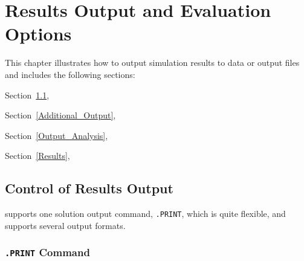 


\chapter{Results Output and Evaluation Options}
\label{Output}

{
This chapter illustrates how to output simulation results to data or output
files and includes the following sections:
\begin{XyceItemize}
  \item Section~\ref{Output_Control}, 
  \item Section~\ref{Additional_Output}, 
  \item Section~\ref{Output_Analysis}, 
  \item Section~\ref{Results}, 
\end{XyceItemize}
}

\section{Control of Results Output}
\label{Output_Control}

\Xyce{} supports one solution output command, \texttt{.PRINT}, which is quite flexible, and supports several output formats.

\subsection{\texttt{.PRINT} Command}
\label{PRINT_section}

